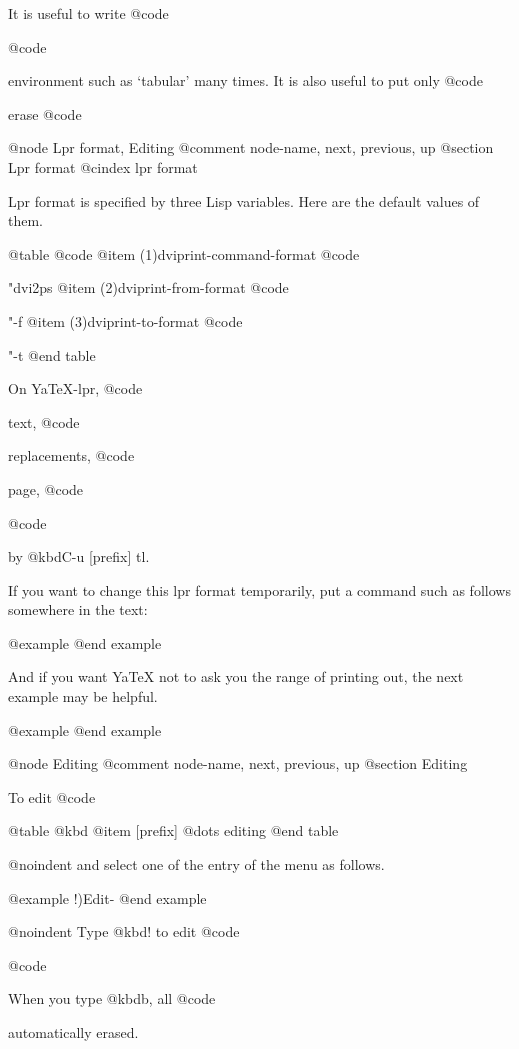 {{{{{  It is useful to write @code{%
@code{%
environment such as `tabular' many times.  It is also useful to put only
@code{%
erase @code{%

@node Lpr format, Editing %
@comment  node-name,  next,  previous,  up
@section Lpr format
@cindex lpr format

  Lpr format is specified by three Lisp variables.  Here are the
default values of them.

@table @code
@item (1)dviprint-command-format
        @code{"dvi2ps %
@item (2)dviprint-from-format
        @code{"-f %
@item (3)dviprint-to-format
        @code{"-t %
@end table

  On YaTeX-lpr, @code{%
text, @code{%
replacements, @code{%
page, @code{%
@code{%
by @kbd{C-u [prefix] tl}.

  If you want to change this lpr format temporarily, put a command
such as follows somewhere in the text:

@example
@end example

  And if you want YaTeX not to ask you the range of printing
out, the next example may be helpful.

@example
@end example

@node Editing %
@comment  node-name,  next,  previous,  up
@section Editing %

  To edit @code{%

@table @kbd
@item [prefix] %
        @dots{} editing %
@end table

@noindent
and select one of the entry of the menu as follows.

@example
        !)Edit-%
@end example

@noindent
Type @kbd{!} to edit @code{%
@code{%
When you type @kbd{b}, all @code{%
automatically erased.

}}}}}}}}}}}}}}}}}}}}}
